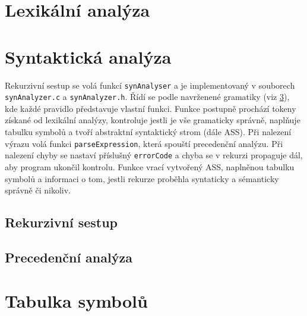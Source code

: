 \documentclass[a4paper, 12pt]{article}
\begin{document}
    \section{Lexikální analýza}

    \section{Syntaktická analýza}
    Rekurzivní sestup se volá funkcí \texttt{synAnalyser} a je implementovaný v souborech \texttt{synAnalyzer.c} a \texttt{synAnalyzer.h}. Řídí se podle navrženené gramatiky (viz \ref{}), kde každé pravidlo představuje vlastní funkci. Funkce postupně prochází tokeny získané od lexikální analýzy, kontroluje jestli je vše gramaticky správně, naplňuje tabulku symbolů a tvoří abstraktní syntaktický strom (dále ASS). Při nalezení výrazu volá funkci \texttt{parseExpression}, která spouští precedenční analýzu. Při nalezení chyby se nastaví příslušný \texttt{errorCode} a chyba se v rekurzi propaguje dál, aby program ukončil kontrolu. Funkce vrací vytvořený ASS, naplněnou tabulku symbolů a informaci o tom, jestli rekurze proběhla syntaticky a sémanticky správně či nikoliv.

    \subsection{Rekurzivní sestup}

    \subsection{Precedenční analýza}

    \section{Tabulka symbolů}
\end{document}
